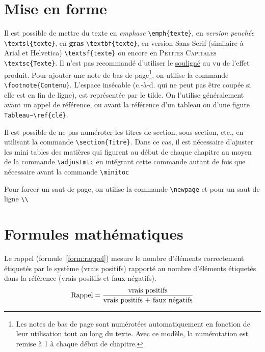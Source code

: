 
\section{Mise en forme}
Il est possible de mettre du texte en \emph{emphase}
\verb+\emph{texte}+, en \textsl{version penchée}
\verb+\textsl{texte}+, en \textbf{gras} \verb+\textbf{texte}+, en
version \textsf{Sans Serif} (similaire à Arial et Helvetica)
\verb+\textsf{texte}+ ou encore en \textsc{Petites Capitales}
\verb+\textsc{Texte}+. Il n'est pas recommandé d'utiliser le
\underline{souligné} au vu de l'effet produit. Pour ajouter une note
de bas de page\footnote{Les notes de bas de page sont numérotées
  automatiquement en fonction de leur utilisation tout au long du
  texte. Avec ce modèle, la numérotation est remise à 1 à chaque début
  de chapitre.}, on utilise la commande
\verb+\footnote{Contenu}+. L'espace insécable (c.-à-d. qui ne peut pas
être coupée si elle est en fin de ligne), est représentée par le
tilde. On l'utilise généralement avant un appel de référence, ou avant
la référence d'un tableau ou d'une figure \verb+Tableau~\ref{clé}+.

Il est possible de ne pas numéroter les titres de section,
sous-section, etc., en utilisant la commande
\verb+\section{Titre}+. Dans ce cas, il est nécessaire d'ajuster les
mini tables des matières qui figurent au début de chaque chapitre au
moyen de la commande \verb+\adjustmtc+ en intégrant cette commande
autant de fois que nécessaire avant la commande \verb+\minitoc+

Pour forcer un saut de page, on utilise la commande \verb+\newpage+ et
pour un saut de ligne \verb+\\+



\section{Formules mathématiques}
 Le rappel (formule~\ref{form:rappel}) mesure le nombre
d'éléments correctement étiquetés par le système (vrais positifs)
rapporté au nombre d'éléments étiquetés dans la référence (vrais
positifs et faux négatifs).
%
\begin{equation}
  \centering
  \text{Rappel} = {{\text{vrais positifs}}\over{\text{vrais positifs + faux négatifs}}}
  \label{form:rappel}
\end{equation}


